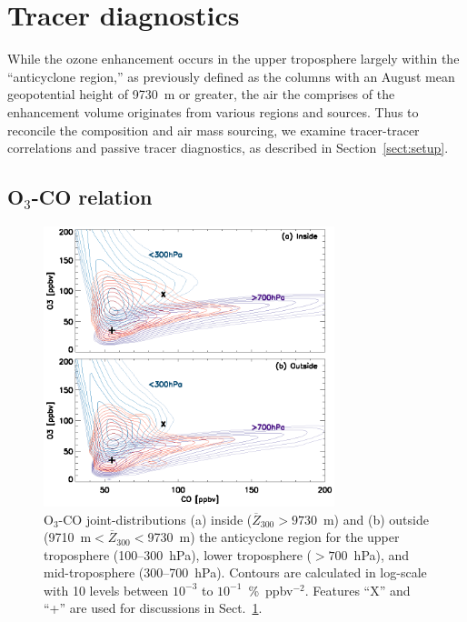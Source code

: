 \section{Tracer diagnostics}\label{sect:diag}

While the ozone enhancement occurs in the upper troposphere largely within the ``anticyclone
region,'' as previously defined as the columns with an August mean geopotential height of 9730~m
or greater, the air the comprises of the enhancement volume originates from various regions and
sources. Thus to reconcile the composition and air mass sourcing, we examine tracer-tracer
correlations and passive tracer diagnostics, as described in Section~\ref{sect:setup}.

\subsection{O$_3$-CO relation}\label{sect:diag/tracer}

 \begin{figure}
	\noindent\includegraphics[width=20pc]{figures/o3co.eps} %
	\caption{O$_3$-CO joint-distributions (a) inside ($\overline{Z}_{300}>9730$~m)
	and (b) outside (9710~m$<\overline{Z}_{300}<$9730~m) the anticyclone region for
	the upper troposphere (100--300~hPa), lower troposphere ($>700$~hPa), and mid-troposphere (300--700~hPa).
	Contours are calculated in log-scale with 10 levels between $10^{-3}$ to $10^{-1}$~\%~ppbv$^{-2}$.
	Features ``X'' and ``+'' are used for discussions in Sect.~\ref{sect:diag}.}
 	\label{fig:o3co}
 \end{figure}

